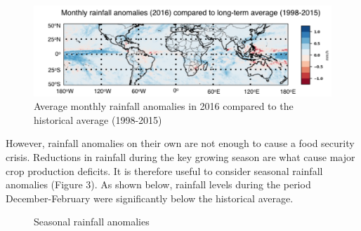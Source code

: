 \documentclass[12pt]{article}
\begin{document}
\begin{figure}[H]
    \label{fig:lta-difference}
\begin{center}
   \includegraphics[width=1.15\linewidth]{figures/lta-diff.png}
\end{center}
\caption{Average monthly rainfall anomalies in 2016 compared to the historical average (1998-2015)}
\end{figure}

However, rainfall anomalies on their own are not enough to cause a food security crisis. Reductions in rainfall during the key growing season are what cause major crop production deficits. It is therefore useful to consider seasonal rainfall anomalies (Figure 3). As shown below, rainfall levels during the period December-February were significantly below the historical average. 

\begin{figure}[H]
    \label{fig:seasonal-anomalies}
\centering
  \hfill
  \hfill
  \hfill  
  \hfill
\caption{Seasonal rainfall anomalies}
\end{figure}
\end{document}
